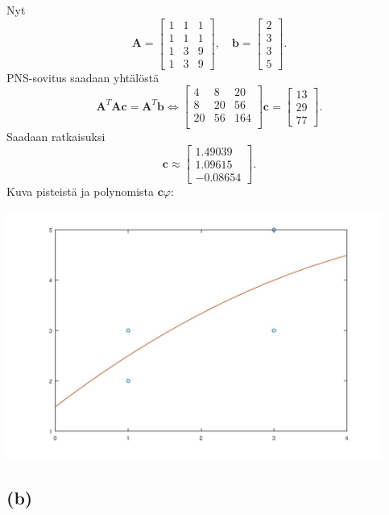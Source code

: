 \documentclass{article}
\begin{document}
Nyt
\[
  \mathbf{A} =
  \begin{bmatrix}
    1 & 1 & 1 \\
    1 & 1 & 1 \\
    1 & 3 & 9 \\
    1 & 3 & 9
  \end{bmatrix}, \quad
  \mathbf{b} =
  \begin{bmatrix}
    2 \\ 3 \\ 3 \\ 5
  \end{bmatrix}.
\]
PNS-sovitus saadaan yhtälöstä
\[
  \mathbf{A}^T\mathbf{Ac} = \mathbf{A}^T\mathbf{b} \iff
  \begin{bmatrix}
    4 & 8 & 20 \\
    8 & 20 & 56 \\
    20 & 56 & 164 \\
  \end{bmatrix}
  \mathbf{c} =
  \begin{bmatrix}
    13 \\ 29 \\ 77
  \end{bmatrix}.
\]
Saadaan ratkaisuksi
\[
  \mathbf{c} \approx \begin{bmatrix}
    1.49039 \\ 1.09615 \\ -0.08654
  \end{bmatrix}.
\]
Kuva pisteistä ja polynomista $\mathbf{c}\varphi$:

\includegraphics[width=350pt]{w4_7a.jpg}


\subsection*{(b)}
\end{document}
